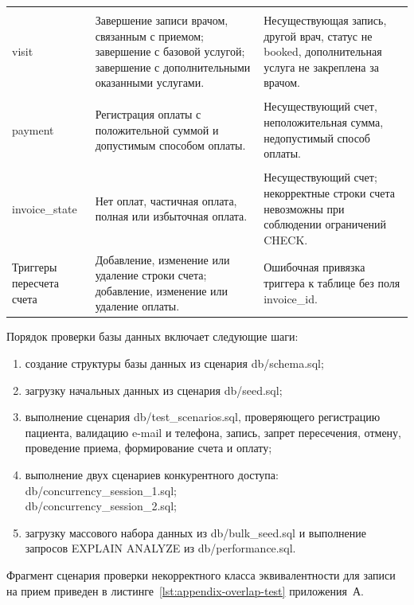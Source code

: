 \begin{table}[H]
\begin{tabularx}{\textwidth}{|>{\raggedright\arraybackslash}p{3.5cm}|>{\raggedright\arraybackslash}X|>{\raggedright\arraybackslash}X|}
        \hline
        \begin{tabular}[t]{@{}l@{}}complete\_\tabularnewline visit\end{tabular} & Завершение записи врачом, связанным с приемом; завершение с базовой услугой; завершение с дополнительными оказанными услугами. & Несуществующая запись, другой врач, статус не booked, дополнительная услуга не закреплена за врачом. \tabularnewline
        \hline
        \begin{tabular}[t]{@{}l@{}}register\_\tabularnewline payment\end{tabular} & Регистрация оплаты с положительной суммой и допустимым способом оплаты. & Несуществующий счет, неположительная сумма, недопустимый способ оплаты. \tabularnewline
        \hline
        \begin{tabular}[t]{@{}l@{}}refresh\_\tabularnewline invoice\_state\end{tabular} & Нет оплат, частичная оплата, полная или избыточная оплата. & Несуществующий счет; некорректные строки счета невозможны при соблюдении ограничений CHECK. \tabularnewline
        \hline
        Триггеры пересчета счета & Добавление, изменение или удаление строки счета; добавление, изменение или удаление оплаты. & Ошибочная привязка триггера к таблице без поля invoice\_id. \tabularnewline
        \hline
    \end{tabularx}
\end{table}
\normalsize

Порядок проверки базы данных включает следующие шаги:
\begin{enumerate}
    \item создание структуры базы данных из сценария db/schema.sql;
    \item загрузку начальных данных из сценария db/seed.sql;
    \item выполнение сценария db/test\_scenarios.sql, проверяющего регистрацию пациента, валидацию e-mail и телефона, запись, запрет пересечения, отмену, проведение приема, формирование счета и оплату;
    \item выполнение двух сценариев конкурентного доступа:\\
    db/concurrency\_session\_1.sql;\\
    db/concurrency\_session\_2.sql;
    \item загрузку массового набора данных из db/bulk\_seed.sql и выполнение запросов EXPLAIN ANALYZE из db/performance.sql.
\end{enumerate}

Фрагмент сценария проверки некорректного класса эквивалентности для записи на прием приведен в листинге~\ref{lst:appendix-overlap-test} приложения~А.

